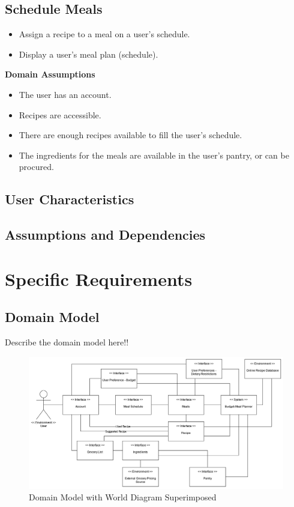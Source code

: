 \documentclass[11pt, letterpaper]{report}
\begin{document}
\section{Schedule Meals}
\begin{itemize}
    \item Assign a recipe to a meal on a user’s schedule.
    \item Display a user’s meal plan (schedule).
\end{itemize}
\textbf{Domain Assumptions}
\begin{itemize}
    \item The user has an account.
    \item Recipes are accessible.
    \item There are enough recipes available to fill the user’s schedule.
    \item The ingredients for the meals are available in the user’s pantry, or can be procured.
\end{itemize}

\section{User Characteristics}

\section{Assumptions and Dependencies}

\chapter{Specific Requirements}

\section{Domain Model}
Describe the domain model here!!

\begin{figure}[h]
    \centering
    \includegraphics[width=\textwidth]{images/Domain_Model.png}
    \caption{Domain Model with World Diagram Superimposed}
\end{figure}
\end{document}
